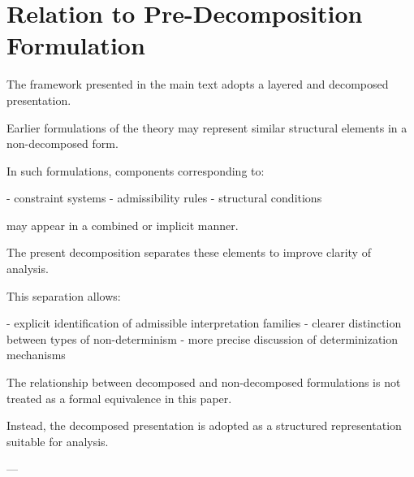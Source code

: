 \section{Relation to Pre-Decomposition Formulation}

The framework presented in the main text adopts a layered and decomposed presentation.

Earlier formulations of the theory may represent similar structural elements in a non-decomposed form.

In such formulations, components corresponding to:

- constraint systems
- admissibility rules
- structural conditions

may appear in a combined or implicit manner.

The present decomposition separates these elements to improve clarity of analysis.

This separation allows:

- explicit identification of admissible interpretation families
- clearer distinction between types of non-determinism
- more precise discussion of determinization mechanisms

The relationship between decomposed and non-decomposed formulations is not treated as a formal equivalence in this paper.

Instead, the decomposed presentation is adopted as a structured representation suitable for analysis.

---
